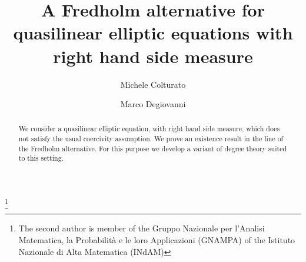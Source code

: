 \documentclass[twoside,reqno]{amsart}
\numberwithin{equation}{section}
\theoremstyle{definition}
\begin{document}

\title[A
Fredholm alternative for quasilinear elliptic equations]{A
Fredholm alternative for quasilinear elliptic equations
with right hand side measure}

\author{Michele Colturato}
\address{Dipartimento di Matematica ``F.~Casorati''\\
         Universit\`a di Pavia\\
         Via Ferrata 5\\
         27100 Pavia, Italy}
\author{Marco Degiovanni}
\address{Dipartimento di Matematica e Fisica\\
         Universit\`a Cattolica del Sacro Cuore\\
         Via dei Musei 41\\
         25121 Bre\-scia, Italy}
\thanks{The second author is member of the 
        Gruppo Nazionale per l'Analisi Matematica, la 
				Probabilit\`a e le loro Applicazioni (GNAMPA) of the 
				Istituto Nazionale di Alta Matematica (INdAM)}
								





%
\begin{abstract}
We consider a quasilinear elliptic equation, with right hand side
measure, which does not satisfy the usual coercivity assumption.
We prove an existence result in the line of the Fredholm
alternative.
For this purpose we develop a variant of degree theory suited
to this setting.
\end{abstract}
%
\maketitle %

\end{document}
